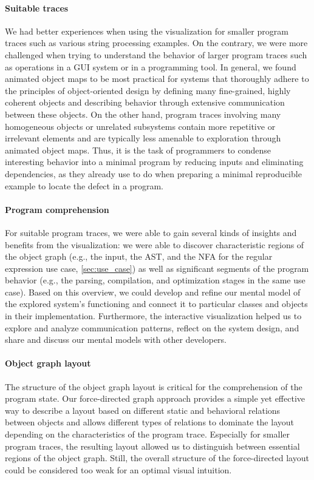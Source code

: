 \paragraph{Suitable traces}

We had better experiences when using the visualization for smaller program traces such as various string processing examples.
On the contrary, we were more challenged when trying to understand the behavior of larger program traces such as operations in a GUI system or in a programming tool.
In general, we found animated object maps to be most practical for systems that thoroughly adhere to the principles of object-oriented design by defining many fine-grained, highly coherent objects and describing behavior through extensive communication between these objects.
On the other hand, program traces involving many homogeneous objects or unrelated subsystems contain more repetitive or irrelevant elements and are typically less amenable to exploration through animated object maps.
Thus, it is the task of programmers to condense interesting behavior into a minimal program by reducing inputs and eliminating dependencies, as they already use to do when preparing a minimal reproducible example to locate the defect in a program.

\paragraph{Program comprehension}

For suitable program traces, we were able to gain several kinds of insights and benefits from the visualization:
we were able to discover characteristic regions of the object graph (e.g., the input, the AST, and the NFA for the regular expression use case, \cref{sec:use_case}) as well as significant segments of the program behavior (e.g., the parsing, compilation, and optimization stages in the same use case).
Based on this overview, we could develop and refine our mental model of the explored system's functioning and connect it to particular classes and objects in their implementation.
Furthermore, the interactive visualization helped us to explore and analyze communication patterns, reflect on the system design, and share and discuss our mental models with other developers.

\paragraph{Object graph layout}

The structure of the object graph layout is critical for the comprehension of the program state.
Our force-directed graph approach provides a simple yet effective way to describe a layout based on different static and behavioral relations between objects and allows different types of relations to dominate the layout depending on the characteristics of the program trace.
Especially for smaller program traces, the resulting layout allowed us to distinguish between essential regions of the object graph.
Still, the overall structure of the force-directed layout could be considered too weak for an optimal visual intuition.

